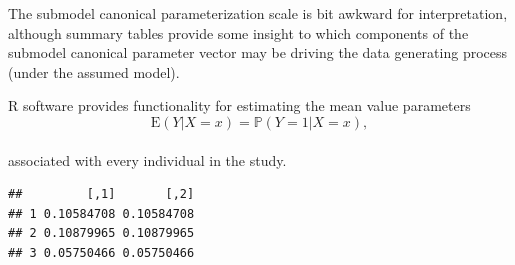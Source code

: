 \documentclass[
  ignorenonframetext,
]{beamer}
\newenvironment{Shaded}{\begin{snugshade}}{\end{snugshade}}
\newcommand{\AttributeTok}[1]{\textcolor[rgb]{0.77,0.63,0.00}{#1}}
\newcommand{\ConstantTok}[1]{\textcolor[rgb]{0.00,0.00,0.00}{#1}}
\newcommand{\DecValTok}[1]{\textcolor[rgb]{0.00,0.00,0.81}{#1}}
\newcommand{\DocumentationTok}[1]{\textcolor[rgb]{0.56,0.35,0.01}{\textbf{\textit{#1}}}}
\newcommand{\FunctionTok}[1]{\textcolor[rgb]{0.00,0.00,0.00}{#1}}
\newcommand{\NormalTok}[1]{#1}
\newcommand{\OtherTok}[1]{\textcolor[rgb]{0.56,0.35,0.01}{#1}}
\newcommand{\SpecialCharTok}[1]{\textcolor[rgb]{0.00,0.00,0.00}{#1}}
\newcommand{\StringTok}[1]{\textcolor[rgb]{0.31,0.60,0.02}{#1}}
\begin{document}
\begin{frame}[fragile]{}
\protect\hypertarget{section-15}{}
The submodel canonical parameterization scale is bit awkward for
interpretation, although summary tables provide some insight to which
components of the submodel canonical parameter vector may be driving the
data generating process (under the assumed model).

\vspace{12pt}

R software provides functionality for estimating the mean value
parameters \[
  \text{E}(Y|X = x) = \mathbb{P}(Y = 1| X = x),
\]\\
associated with every individual in the study.

\vspace{12pt}
\tiny

\begin{Shaded}
\end{Shaded}

\begin{verbatim}
##         [,1]       [,2]
## 1 0.10584708 0.10584708
## 2 0.10879965 0.10879965
## 3 0.05750466 0.05750466
\end{verbatim}
\end{frame}
\end{document}
